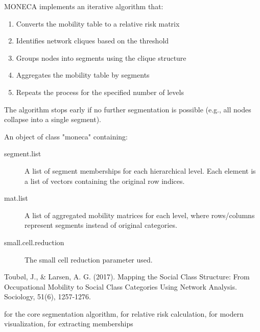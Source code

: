 \documentclass[a4paper]{book}
\begin{document}
%
\begin{Details}
MONECA implements an iterative algorithm that:
\begin{enumerate}

\item{} Converts the mobility table to a relative risk matrix
\item{} Identifies network cliques based on the threshold
\item{} Groups nodes into segments using the clique structure
\item{} Aggregates the mobility table by segments
\item{} Repeats the process for the specified number of levels

\end{enumerate}


The algorithm stops early if no further segmentation is possible (e.g., all
nodes collapse into a single segment).
\end{Details}
%
\begin{Value}
An object of class "moneca" containing:
\begin{description}

\item[segment.list] A list of segment memberships for each hierarchical level.
Each element is a list of vectors containing the original row indices.
\item[mat.list] A list of aggregated mobility matrices for each level, where
rows/columns represent segments instead of original categories.
\item[small.cell.reduction] The small cell reduction parameter used.

\end{description}

\end{Value}
%
\begin{References}
Toubøl, J., \& Larsen, A. G. (2017). Mapping the Social Class Structure: 
From Occupational Mobility to Social Class Categories Using Network Analysis.
Sociology, 51(6), 1257-1276.
\end{References}
%
\begin{SeeAlso}
 for the core segmentation algorithm,
 for relative risk calculation,
 for modern visualization,
 for extracting memberships
\end{SeeAlso}
\end{document}
